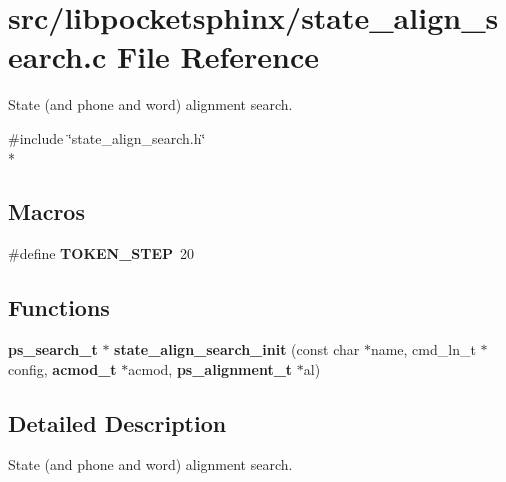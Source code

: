 \section{src/libpocketsphinx/state\+\_\+align\+\_\+search.c File Reference}
\label{state__align__search_8c}


State (and phone and word) alignment search.  


{\ttfamily \#include \char`\"{}state\+\_\+align\+\_\+search.\+h\char`\"{}}\\*
\subsection*{Macros}
\begin{DoxyCompactItemize}
\item 
\#define {\bfseries T\+O\+K\+E\+N\+\_\+\+S\+T\+E\+P}~20\label{state__align__search_8c_a197a0cf5b150b88b0e3043fd78550931}

\end{DoxyCompactItemize}
\subsection*{Functions}
\begin{DoxyCompactItemize}
\item 
{\bf ps\+\_\+search\+\_\+t} $\ast$ {\bfseries state\+\_\+align\+\_\+search\+\_\+init} (const char $\ast$name, cmd\+\_\+ln\+\_\+t $\ast$config, {\bf acmod\+\_\+t} $\ast$acmod, {\bf ps\+\_\+alignment\+\_\+t} $\ast$al)\label{state__align__search_8c_a037465636cb9d40dd1ebc1e04c0fd633}

\end{DoxyCompactItemize}


\subsection{Detailed Description}
State (and phone and word) alignment search. 

